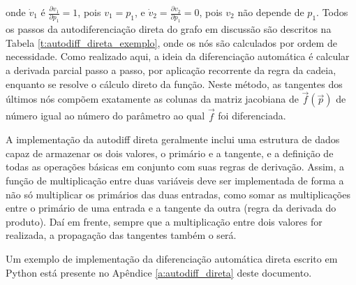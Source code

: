       \noindent onde $\dot{v}_1$ é $\frac{\partial v_1}{\partial p_1} = 1$, pois $v_1 = p_1$, e $\dot{v}_2 = \frac{\partial v_2}{\partial p_1} = 0$, pois $v_2$ não depende de $p_1$. Todos os passos da autodiferenciação direta do grafo em discussão são descritos na Tabela \ref{t:autodiff_direta_exemplo}, onde os nós são calculados por ordem de necessidade. Como realizado aqui, a ideia da diferenciação automática é calcular a derivada parcial passo a passo, por aplicação recorrente da regra da cadeia, enquanto se resolve o cálculo direto da função. Neste método, as tangentes dos últimos nós compõem exatamente as colunas da matriz jacobiana de $\vec{f}(\vec{p})$ de número igual ao número do parâmetro ao qual $\vec{f}$ foi diferenciada.

      A implementação da autodiff direta geralmente inclui uma estrutura de dados capaz de armazenar os dois valores, o primário e a tangente, e a definição de todas as operações básicas em conjunto com suas regras de derivação. Assim, a função de multiplicação entre duas variáveis deve ser implementada de forma a não só multiplicar os primários das duas entradas, como somar as multiplicações entre o primário de uma entrada e a tangente da outra (regra da derivada do produto). Daí em frente, sempre que a multiplicação entre dois valores for realizada, a propagação das tangentes também o será.

      Um exemplo de implementação da diferenciação automática direta escrito em Python está presente no Apêndice \ref{a:autodiff_direta} deste documento.

